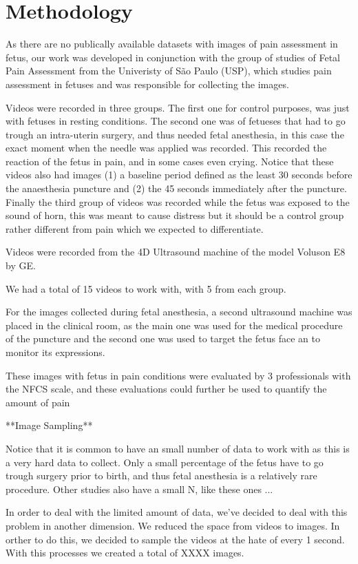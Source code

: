 \chapter{Methodology}

As there are no publically available datasets with images of pain assessment in fetus, our work was developed in conjunction with the group of studies of Fetal Pain Assessment from the Univeristy of São Paulo (USP), which studies pain assessment in fetuses and was responsible for collecting the images.

Videos were recorded in three groups. The first one for control purposes, was just with fetuses in resting conditions. The second one was of fetueses that had to go trough an intra-uterin surgery, and thus needed fetal anesthesia, in this case the exact moment when the needle was applied was recorded. This recorded the reaction of the fetus in pain, and in some cases even crying. Notice that these videos also had images (1) a baseline period defined as the least 30 seconds before the anaesthesia puncture and (2) the 45 seconds immediately after the puncture. Finally the third group of videos was recorded while the fetus was exposed to the sound of horn, this was meant to cause distress but it should be a control group rather different from pain which we expected to differentiate.

Videos were recorded from the 4D Ultrasound machine of the model Voluson E8 by GE. 

We had a total of 15 videos to work with, with 5 from each group.

For the images collected during fetal anesthesia, a second ultrasound machine was placed in the clinical room, as the main one was used for the medical procedure of the puncture and the second one was used to target the fetus face an to monitor its expressions.

These images with fetus in pain conditions were evaluated by 3 professionals with the NFCS scale, and these evaluations could further be used to quantify the amount of pain 

**Image Sampling**

Notice that it is common to have an small number of data to work with as this is a very hard data to collect. Only a small percentage of the fetus have to go trough surgery prior to birth, and thus fetal anesthesia is a relatively rare procedure. Other studies also have a small N, like these ones ... 

In order to deal with the limited amount of data, we've decided to deal with this problem in another dimension. We reduced the space from videos to images. In orther to do this, we decided to sample the videos at the hate of every 1 second. With this processes we created a total of XXXX images.

